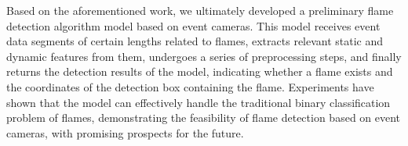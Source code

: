 \begin{abstract*}
  Based on the aforementioned work, we ultimately developed a preliminary flame detection algorithm model based on event 
  cameras. This model receives event data segments of certain lengths related to flames, extracts relevant static and 
  dynamic features from them, undergoes a series of preprocessing steps, and finally returns the detection results of 
  the model, indicating whether a flame exists and the coordinates of the detection box containing the flame. Experiments 
  have shown that the model can effectively handle the traditional binary classification problem of flames, demonstrating 
  the feasibility of flame detection based on event cameras, with promising prospects for the future.
\end{abstract*}
